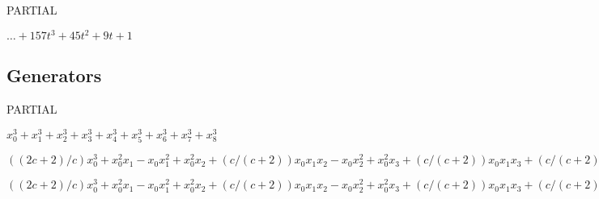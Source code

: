 \documentclass{article}
\numberwithin{equation}{section}
\begin{document}
PARTIAL

$\dots + 157t^3 + 45t^2 + 9t + 1$



\subsection{Generators} 

PARTIAL

$x_0^3 + x_1^3 + x_2^3 + x_3^3 + x_4^3 + x_5^3 + x_6^3 + x_7^3 + x_8^3$


$((2c + 2)/c)x_0^3 + x_0^2x_1 - x_0x_1^2 + x_0^2x_2 + (c/(c +
2))x_0x_1x_2 - x_0x_2^2 + x_0^2x_3 + (c/(c + 2))x_0x_1x_3 +
(c/(c + 2))x_0x_2x_3 - x_0x_3^2 + x_0^2x_4 + (c/(c +
2))x_0x_1x_4 + (c/(c + 2))x_0x_2x_4 + (c/(c + 2))x_0x_3x_4 -
x_0x_4^2 + x_0^2x_5 + (c/(c + 2))x_0x_1x_5 + (c/(c +
2))x_0x_2x_5 + (c/(c + 2))x_0x_3x_5 + (c/(c + 2))x_0x_4x_5 -
x_0x_5^2 + x_0^2x_6 + (c/(c + 2))x_0x_1x_6 + (c/(c +
2))x_0x_2x_6 + (c/(c + 2))x_0x_3x_6 + (c/(c + 2))x_0x_4x_6 +
(c/(c + 2))x_0x_5x_6 - x_0x_6^2 - x_0^2x_7 + x_1^2x_7 + (2c/(c +
2))x_1x_2x_7 + x_2^2x_7 + (2c/(c + 2))x_1x_3x_7 + (2c/(c +
2))x_2x_3x_7 + x_3^2x_7 + (2c/(c + 2))x_1x_4x_7 + (2c/(c +
2))x_2x_4x_7 + (2c/(c + 2))x_3x_4x_7 + x_4^2x_7 + (2c/(c +
2))x_1x_5x_7 + (2c/(c + 2))x_2x_5x_7 + (2c/(c + 2))x_3x_5x_7
+ (2c/(c + 2))x_4x_5x_7 + x_5^2x_7 + (2c/(c + 2))x_1x_6x_7 +
(2c/(c + 2))x_2x_6x_7 + (2c/(c + 2))x_3x_6x_7 + (2c/(c +
2))x_4x_6x_7 + (2c/(c + 2))x_5x_6x_7 + x_6^2x_7 + x_0x_7^2 -
x_1x_7^2 - x_2x_7^2 - x_3x_7^2 - x_4x_7^2 - x_5x_7^2 - x_6x_7^2 +
((c + 1)/c)x_7^3 + x_0^2x_8 + (c/(c + 2))x_0x_1x_8 + (c/(c +
2))x_0x_2x_8 + (c/(c + 2))x_0x_3x_8 + (c/(c + 2))x_0x_4x_8 +
(c/(c + 2))x_0x_5x_8 + (c/(c + 2))x_0x_6x_8 + (2c/(c +
2))x_1x_7x_8 + (2c/(c + 2))x_2x_7x_8 + (2c/(c + 2))x_3x_7x_8
+ (2c/(c + 2))x_4x_7x_8 + (2c/(c + 2))x_5x_7x_8 + (2c/(c +
2))x_6x_7x_8 - x_7^2x_8 - x_0x_8^2 + x_7x_8^2$


$((2c + 2)/c)x_0^3 + x_0^2x_1 - x_0x_1^2 + x_0^2x_2 + (c/(c +
2))x_0x_1x_2 - x_0x_2^2 + x_0^2x_3 + (c/(c + 2))x_0x_1x_3 +
(c/(c + 2))x_0x_2x_3 - x_0x_3^2 + x_0^2x_4 + (c/(c +
2))x_0x_1x_4 + (c/(c + 2))x_0x_2x_4 + (c/(c + 2))x_0x_3x_4 -
x_0x_4^2 + x_0^2x_5 + (c/(c + 2))x_0x_1x_5 + (c/(c +
2))x_0x_2x_5 + (c/(c + 2))x_0x_3x_5 + (c/(c + 2))x_0x_4x_5 -
x_0x_5^2 - x_0^2x_6 + x_1^2x_6 + (2c/(c + 2))x_1x_2x_6 +
x_2^2x_6 + (2c/(c + 2))x_1x_3x_6 + (2c/(c + 2))x_2x_3x_6 +
x_3^2x_6 + (2c/(c + 2))x_1x_4x_6 + (2c/(c + 2))x_2x_4x_6 +
(2c/(c + 2))x_3x_4x_6 + x_4^2x_6 + (2c/(c + 2))x_1x_5x_6 +
(2c/(c + 2))x_2x_5x_6 + (2c/(c + 2))x_3x_5x_6 + (2c/(c +
2))x_4x_5x_6 + x_5^2x_6 + x_0x_6^2 - x_1x_6^2 - x_2x_6^2 -
x_3x_6^2 - x_4x_6^2 - x_5x_6^2 + ((c + 1)/c)x_6^3 + x_0^2x_7 +
(c/(c + 2))x_0x_1x_7 + (c/(c + 2))x_0x_2x_7 + (c/(c +
2))x_0x_3x_7 + (c/(c + 2))x_0x_4x_7 + (c/(c + 2))x_0x_5x_7 +
(2c/(c + 2))x_1x_6x_7 + (2c/(c + 2))x_2x_6x_7 + (2c/(c +
2))x_3x_6x_7 + (2c/(c + 2))x_4x_6x_7 + (2c/(c + 2))x_5x_6x_7
- x_6^2x_7 - x_0x_7^2 + x_6x_7^2 + x_0^2x_8 + (c/(c +
2))x_0x_1x_8 + (c/(c + 2))x_0x_2x_8 + (c/(c + 2))x_0x_3x_8 +
(c/(c + 2))x_0x_4x_8 + (c/(c + 2))x_0x_5x_8 + (2c/(c +
2))x_1x_6x_8 + (2c/(c + 2))x_2x_6x_8 + (2c/(c + 2))x_3x_6x_8
+ (2c/(c + 2))x_4x_6x_8 + (2c/(c + 2))x_5x_6x_8 - x_6^2x_8 +
(c/(c + 2))x_0x_7x_8 + (2c/(c + 2))x_6x_7x_8 - x_0x_8^2 +
x_6x_8^2$
\end{document}
